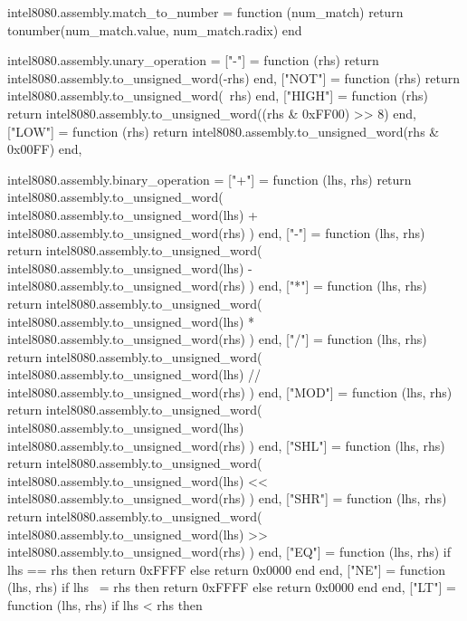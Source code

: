 intel8080.assembly.match_to_number = function (num_match)
    return tonumber(num_match.value, num_match.radix)
end

intel8080.assembly.unary_operation = {
    ["-"] = function (rhs)
        return intel8080.assembly.to_unsigned_word(-rhs)
    end,
    ["NOT"] = function (rhs)
        return intel8080.assembly.to_unsigned_word(~rhs)
    end,
    ["HIGH"] = function (rhs)
        return intel8080.assembly.to_unsigned_word((rhs & 0xFF00) >> 8)
    end,
    ["LOW"] = function (rhs)
        return intel8080.assembly.to_unsigned_word(rhs & 0x00FF)
    end,
}

intel8080.assembly.binary_operation = {
    ["+"] = function (lhs, rhs)
        return intel8080.assembly.to_unsigned_word(
            intel8080.assembly.to_unsigned_word(lhs)
            +
            intel8080.assembly.to_unsigned_word(rhs)
        )
    end,
    ["-"] = function (lhs, rhs)
        return intel8080.assembly.to_unsigned_word(
            intel8080.assembly.to_unsigned_word(lhs)
            -
            intel8080.assembly.to_unsigned_word(rhs)
        )
    end,
    ["*"] = function (lhs, rhs)
        return intel8080.assembly.to_unsigned_word(
            intel8080.assembly.to_unsigned_word(lhs)
            *
            intel8080.assembly.to_unsigned_word(rhs)
        )
    end,
    ["/"] = function (lhs, rhs)
        return intel8080.assembly.to_unsigned_word(
            intel8080.assembly.to_unsigned_word(lhs)
            //
            intel8080.assembly.to_unsigned_word(rhs)
        )
    end,
    ["MOD"] = function (lhs, rhs)
        return intel8080.assembly.to_unsigned_word(
            intel8080.assembly.to_unsigned_word(lhs)
            intel8080.assembly.to_unsigned_word(rhs)
        )
    end,
    ["SHL"] = function (lhs, rhs)
        return intel8080.assembly.to_unsigned_word(
            intel8080.assembly.to_unsigned_word(lhs)
            <<
            intel8080.assembly.to_unsigned_word(rhs)
        )
    end,
    ["SHR"] = function (lhs, rhs)
        return intel8080.assembly.to_unsigned_word(
            intel8080.assembly.to_unsigned_word(lhs)
            >>
            intel8080.assembly.to_unsigned_word(rhs)
        )
    end,
    ["EQ"] = function (lhs, rhs)
        if lhs == rhs then
            return 0xFFFF
        else
            return 0x0000
        end
    end,
    ["NE"] = function (lhs, rhs)
        if lhs ~= rhs then
            return 0xFFFF
        else
            return 0x0000
        end
    end,
    ["LT"] = function (lhs, rhs)
        if lhs < rhs then
}

